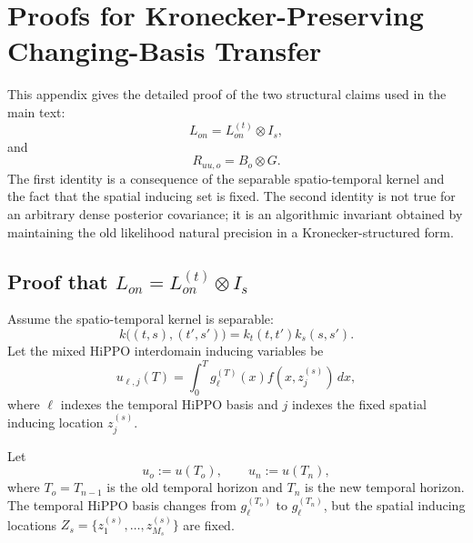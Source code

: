 \documentclass[12pt]{article}
\begin{document}
\appendix

\section{Proofs for Kronecker-Preserving Changing-Basis Transfer}
\label{app:kron_preserving_transfer_proofs}

This appendix gives the detailed proof of the two structural claims used
in the main text:
\begin{equation}
    L_{on}=L_{on}^{(t)}\otimes I_s,
    \label{eq:app_Lon_kron_claim}
\end{equation}
and
\begin{equation}
    R_{uu,o}=B_o\otimes G.
    \label{eq:app_Ruu_kron_claim}
\end{equation}
The first identity is a consequence of the separable spatio-temporal
kernel and the fact that the spatial inducing set is fixed. The second
identity is not true for an arbitrary dense posterior covariance; it is an
algorithmic invariant obtained by maintaining the old likelihood natural
precision in a Kronecker-structured form.

\subsection{\texorpdfstring{Proof that \(L_{on}=L_{on}^{(t)}\otimes I_s\)}{Proof that Lon = Lon(t) tensor Is}}
\label{app:proof_Lon_temporal_only}

Assume the spatio-temporal kernel is separable:
\begin{equation}
    k\big((t,s),(t',s')\big)
    =
    k_t(t,t')k_s(s,s').
    \label{eq:app_sep_kernel}
\end{equation}
Let the mixed HiPPO interdomain inducing variables be
\begin{equation}
    u_{\ell,j}(T)
    =
    \int_0^T
    g_\ell^{(T)}(x)f(x,z_j^{(s)})\,dx,
    \label{eq:app_mixed_inducing}
\end{equation}
where \(\ell\) indexes the temporal HiPPO basis and \(j\) indexes the
fixed spatial inducing location \(z_j^{(s)}\).

Let
\begin{equation}
    u_o := u(T_o),
    \qquad
    u_n := u(T_n),
\end{equation}
where \(T_o=T_{n-1}\) is the old temporal horizon and \(T_n\) is the new
temporal horizon. The temporal HiPPO basis changes from
\(g_\ell^{(T_o)}\) to \(g_\ell^{(T_n)}\), but the spatial inducing
locations \(Z_s=\{z_1^{(s)},\ldots,z_{M_s}^{(s)}\}\) are fixed.
\end{document}

